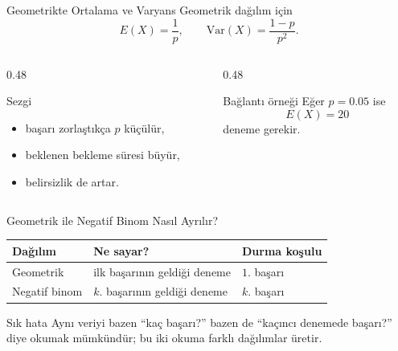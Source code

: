 \documentclass[light]{lutbeamer}
\begin{document}
\begin{frame}{Geometrikte Ortalama ve Varyans}
    \small
    Geometrik dağılım için
    \[
    E(X)=\frac{1}{p}, \qquad \mathrm{Var}(X)=\frac{1-p}{p^2}.
    \]

    \begin{columns}[T]
        \begin{column}{0.48\textwidth}
            \begin{block}{Sezgi}
                \begin{itemize}
                    \item başarı zorlaştıkça \(p\) küçülür,
                    \item beklenen bekleme süresi büyür,
                    \item belirsizlik de artar.
                \end{itemize}
            \end{block}
        \end{column}
        \begin{column}{0.48\textwidth}
            \begin{exampleblock}{Bağlantı örneği}
                Eğer \(p=0.05\) ise
                \[
                E(X)=20
                \]
                deneme gerekir.
            \end{exampleblock}
        \end{column}
    \end{columns}
\end{frame}

\begin{frame}{Geometrik ile Negatif Binom Nasıl Ayrılır?}
    \small
    \begin{center}
        \begin{tabular}{@{}lll@{}}
            \toprule
            \textbf{Dağılım} & \textbf{Ne sayar?} & \textbf{Durma koşulu} \\ \midrule
            Geometrik & ilk başarının geldiği deneme & \(1\). başarı \\
            Negatif binom & \(k\). başarının geldiği deneme & \(k\). başarı \\ \bottomrule
        \end{tabular}
    \end{center}

    \begin{alertblock}{Sık hata}
        Aynı veriyi bazen ``kaç başarı?'' bazen de ``kaçıncı denemede başarı?'' diye okumak mümkündür; bu iki okuma farklı dağılımlar üretir.
    \end{alertblock}
\end{frame}
\end{document}
